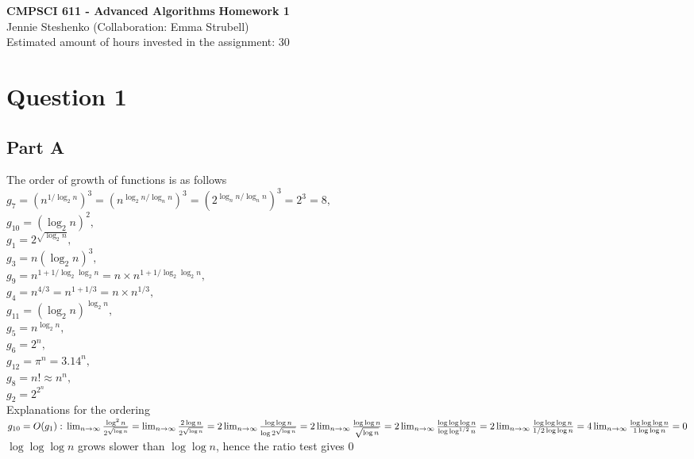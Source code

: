 \documentclass{article}
\begin{document}
\begin{center} \LARGE\textbf{CMPSCI 611 - Advanced Algorithms}
\Large\textbf{Homework 1}
\vspace{0.5cm}\\Jennie Steshenko \small{(Collaboration: Emma Strubell)}\\
Estimated amount of hours invested in the assignment: 30
\end{center}

\section*{Question 1}
\subsection*{Part A}
The order of growth of functions is as follows\\ 
$ g_7 = (n^{1/\log_2 n})^3 = (n^{{\log_2 n}/{\log_n n}})^3 = (2^{{\log_n
n}/{\log_n n}})^3 = 2^3 = 8,$\\
$g_{10} = (\log_2 n)^2,$\\
$g_1 = 2^{\sqrt{\log_2 n}},$\\
$g_3 = n(\log_2 n)^3,$\\
$g_9 = n^{1+1/\log_2 \log_2 n} = n \times {n^{1+1/\log_2 \log_2 n}},$\\ 
$g_4 = n^{4/3} = n^{1+1/3} = n \times n^{1/3},$\\
$g_{11} = (\log_2 n)^{\log_2 n},$\\
$g_5 = n^{\log_2 n},$\\
$g_6 = 2^n,$\\
$g_{12} = \pi^n = 3.14^n,$\\
$g_8 = n! \approx{n^n},$\\
$g_2 = 2^{2^n}$\\

Explanations for the ordering\\

$g_{10} = O(g_1):\\
\lim_{n\to\infty}\frac{\log^2n}{2^{\sqrt{\log n}}} =
\lim_{n\to\infty}\frac{2\log n}{2^{\sqrt{\log n}}} =
2\lim_{n\to\infty}\frac{\log\log n}{\log2^{\sqrt{\log n}}} = 
2\lim_{n\to\infty}\frac{\log\log n}{\sqrt{\log n}} =  
2\lim_{n\to\infty}\frac{\log\log\log n}{\log\log^{1/2}n} =
2\lim_{n\to\infty}\frac{\log\log\log n}{1/2\log\log n} = 
4\lim_{n\to\infty}\frac{\log\log\log n}{1\log\log n} = 0$\\
$\log\log\log n$ grows slower than $\log\log n$, hence the ratio test gives 0\\
\end{document}
